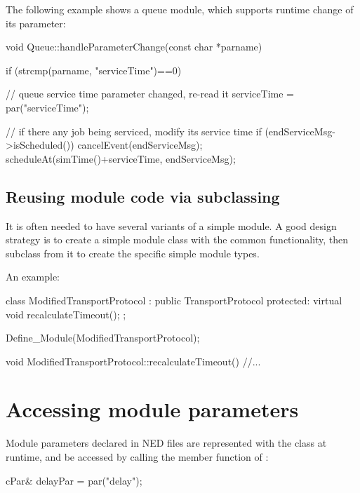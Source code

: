 The following example shows a queue module, which supports
runtime change of its  parameter:

\begin{cpp}
void Queue::handleParameterChange(const char *parname)
{
    if (strcmp(parname, "serviceTime")==0)
    {
        // queue service time parameter changed, re-read it
        serviceTime = par("serviceTime");

        // if there any job being serviced, modify its service time
        if (endServiceMsg->isScheduled())
        {
            cancelEvent(endServiceMsg);
            scheduleAt(simTime()+serviceTime, endServiceMsg);
        }
    }
}
\end{cpp}




\subsection{Reusing module code via subclassing}
\label{sec:simple-modules:module-subclassing}

It is often needed to have several variants of a simple module.
A good design strategy is to create a simple module class with
the common functionality, then subclass from it to create the
specific simple module types.


An example:

\begin{cpp}
class ModifiedTransportProtocol : public TransportProtocol
{
  protected:
    virtual void recalculateTimeout();
};

Define_Module(ModifiedTransportProtocol);

void ModifiedTransportProtocol::recalculateTimeout()
{
    //...
}
\end{cpp}




\section{Accessing module parameters}
\label{sec:simple-modules:parameters}

Module parameters declared in NED files are represented with the 
class at runtime, and be accessed
by calling the  member function of :

\begin{cpp}
cPar& delayPar = par("delay");
\end{cpp}

